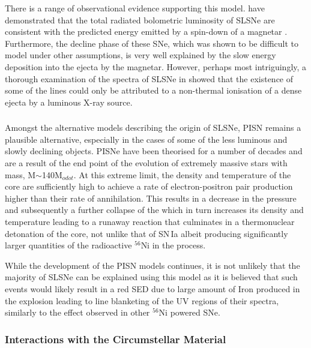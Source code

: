 There is a range of observational evidence supporting this model.  have demonstrated that the total radiated bolometric luminosity of SLSNe are consistent with the predicted energy emitted by a spin-down of a magnetar \citep{Inserra2013}. Furthermore, the decline phase of these SNe, which was shown to be difficult to model under other assumptions, is very well explained by the slow energy deposition into the ejecta by the magnetar. However, perhaps most intriguingly, a thorough examination of the spectra of SLSNe in \citet{Mazzali2015} showed that the existence of some of the lines could only be attributed to a non-thermal ionisation of a dense ejecta by a luminous X-ray source.

\subsubsection{}
Amongst the alternative models describing the origin of SLSNe, PISN remains a plausible alternative, especially in the cases of some of the less luminous and slowly declining objects. PISNe have been theorised for a number of decades \citep{Fraley1968} and are a result of the end point of the evolution of extremely massive stars with mass, M$\sim$140M$_{odot}$. At this extreme limit, the density and temperature of the core are sufficiently high to achieve a rate of electron-positron pair production higher than their rate of annihilation. This results in a decrease in the pressure and subsequently a further collapse of the  which in turn increases its density and temperature leading to a runaway reaction that culminates in a thermonuclear detonation of the core, not unlike that of SN\,Ia albeit producing significantly larger quantities of the radioactive $^{56}$Ni in the process.

While the development of the PISN models continues, it is not unlikely that the majority of SLSNe can be explained using this model as it is believed \citep{Jerkstrand2016} that such events would likely result in a red SED due to large amount of Iron produced in the explosion leading to line blanketing of the UV regions of their spectra, similarly to the effect observed in other $^{56}$Ni powered SNe.

\subsubsection{Interactions with the Circumstellar Material}

